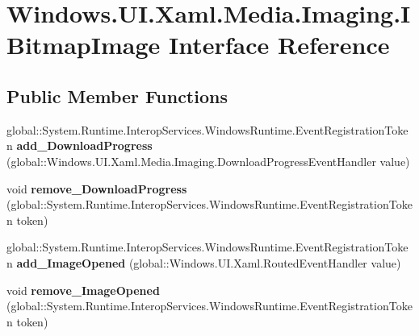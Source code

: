 \hypertarget{interface_windows_1_1_u_i_1_1_xaml_1_1_media_1_1_imaging_1_1_i_bitmap_image}{}\section{Windows.\+U\+I.\+Xaml.\+Media.\+Imaging.\+I\+Bitmap\+Image Interface Reference}
\label{interface_windows_1_1_u_i_1_1_xaml_1_1_media_1_1_imaging_1_1_i_bitmap_image}
\subsection*{Public Member Functions}
\begin{DoxyCompactItemize}
\item 
\mbox{\label{interface_windows_1_1_u_i_1_1_xaml_1_1_media_1_1_imaging_1_1_i_bitmap_image_a81353ece4edf0af8840923994b02b772}} 
global\+::\+System.\+Runtime.\+Interop\+Services.\+Windows\+Runtime.\+Event\+Registration\+Token {\bfseries add\+\_\+\+Download\+Progress} (global\+::\+Windows.\+U\+I.\+Xaml.\+Media.\+Imaging.\+Download\+Progress\+Event\+Handler value)
\item 
\mbox{\label{interface_windows_1_1_u_i_1_1_xaml_1_1_media_1_1_imaging_1_1_i_bitmap_image_ab600f3019a91621d8000a9cdc22141e7}} 
void {\bfseries remove\+\_\+\+Download\+Progress} (global\+::\+System.\+Runtime.\+Interop\+Services.\+Windows\+Runtime.\+Event\+Registration\+Token token)
\item 
\mbox{\label{interface_windows_1_1_u_i_1_1_xaml_1_1_media_1_1_imaging_1_1_i_bitmap_image_a0a0af7713d2dfccf2cd37b15f1f121ea}} 
global\+::\+System.\+Runtime.\+Interop\+Services.\+Windows\+Runtime.\+Event\+Registration\+Token {\bfseries add\+\_\+\+Image\+Opened} (global\+::\+Windows.\+U\+I.\+Xaml.\+Routed\+Event\+Handler value)
\item 
\mbox{\label{interface_windows_1_1_u_i_1_1_xaml_1_1_media_1_1_imaging_1_1_i_bitmap_image_ac903f9457bc42510bd952dcb07c5c1d1}} 
void {\bfseries remove\+\_\+\+Image\+Opened} (global\+::\+System.\+Runtime.\+Interop\+Services.\+Windows\+Runtime.\+Event\+Registration\+Token token)

\end{DoxyCompactItemize}

